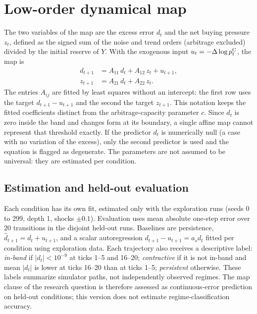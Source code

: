 \section{Low-order dynamical map}

The two variables of the map are the excess error $d_t$ and the net buying pressure $z_t$, defined as the signed sum of the noise and trend orders (arbitrage excluded) divided by the initial reserve of $Y$. With the exogenous input $u_t=-\Delta\log p^{\mathrm{C}}_t$, the map is
\begin{align}
  d_{t+1} &= A_{11}\,d_t + A_{12}\,z_t + u_{t+1}, \label{eq:mapa-d}\\
  z_{t+1} &= A_{21}\,d_t + A_{22}\,z_t. \label{eq:mapa-z}
\end{align}
The entries $A_{ij}$ are fitted by least squares without an intercept: the first row uses the target $d_{t+1}-u_{t+1}$ and the second the target $z_{t+1}$. This notation keeps the fitted coefficients distinct from the arbitrage-capacity parameter $c$. Since $d_t$ is zero inside the band and changes form at its boundary, a single affine map cannot represent that threshold exactly. If the predictor $d_t$ is numerically null (a case with no variation of the excess), only the second predictor is used and the equation is flagged as degenerate. The parameters are not assumed to be universal: they are estimated per condition.


\subsection{Estimation and held-out evaluation}

Each condition has its own fit, estimated only with the exploration runs (seeds 0 to 299, depth 1, shocks $\pm0.1$). Evaluation uses mean absolute one-step error over 20 transitions in the disjoint held-out runs. Baselines are persistence, $\hat d_{t+1}=d_t+u_{t+1}$, and a scalar autoregression $d_{t+1}-u_{t+1}=a_s d_t$ fitted per condition using exploration data. Each trajectory also receives a descriptive label: \emph{in-band} if $|d_t|<10^{-9}$ at ticks 1--5 and 16--20; \emph{contractive} if it is not in-band and mean $|d_t|$ is lower at ticks 16--20 than at ticks 1--5; \emph{persistent} otherwise. These labels summarize simulator paths, not independently observed regimes. The map clause of the research question is therefore assessed as continuous-error prediction on held-out conditions; this version does not estimate regime-classification accuracy.

